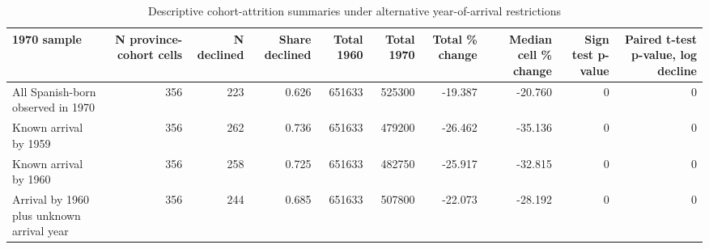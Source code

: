 \begin{table}

\caption{Descriptive cohort-attrition summaries under alternative year-of-arrival restrictions}
\centering
\begin{tabular}[t]{lrrrrrrrrr}
\toprule
1970 sample & N province-cohort cells & N declined & Share declined & Total 1960 & Total 1970 & Total \% change & Median cell \% change & Sign test p-value & Paired t-test p-value, log decline\\
\midrule
All Spanish-born observed in 1970 & 356 & 223 & 0.626 & 651633 & 525300 & -19.387 & -20.760 & 0 & 0\\
Known arrival by 1959 & 356 & 262 & 0.736 & 651633 & 479200 & -26.462 & -35.136 & 0 & 0\\
Known arrival by 1960 & 356 & 258 & 0.725 & 651633 & 482750 & -25.917 & -32.815 & 0 & 0\\
Arrival by 1960 plus unknown arrival year & 356 & 244 & 0.685 & 651633 & 507800 & -22.073 & -28.192 & 0 & 0\\
\bottomrule
\end{tabular}
\end{table}
